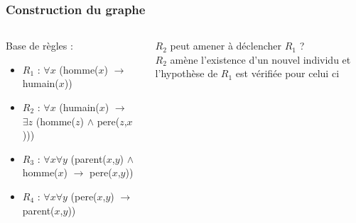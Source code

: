 \begin{frame}
	\frametitle{Construction du graphe}
	\begin{columns}
	\begin{column}{0.55\linewidth}
		Base de règles :
		\begin{itemize}
			\item $R_1$ : $\forall x$ (homme($x$) $\rightarrow$ humain($x$))
			\item $R_2$ : $\forall x$ (humain($x$) $\rightarrow$ $\exists z$ (homme($z$)
			$\wedge$ pere($z$,$x$)))
			\item $R_3$ : $\forall x \forall y$ (parent($x$,$y$) $\wedge$ homme($x$)
			$\rightarrow$ pere($x$,$y$))
			\item $R_4$ : $\forall x \forall y$ (pere($x$,$y$) $\rightarrow$
			parent($x$,$y$))
		\end{itemize}
	\end{column}
	\vline
	\hfill
	\begin{column}{0.35\linewidth}
		\begin{center}
			$R_2$ peut amener à déclencher $R_1$ ?\\
			$R_2$ amène l'existence d'un nouvel individu et
			l'hypothèse de $R_1$ est vérifiée pour celui ci
		\end{center}
		\begin{figure}
		\end{figure}
	\end{column}
	\end{columns}
\end{frame}



